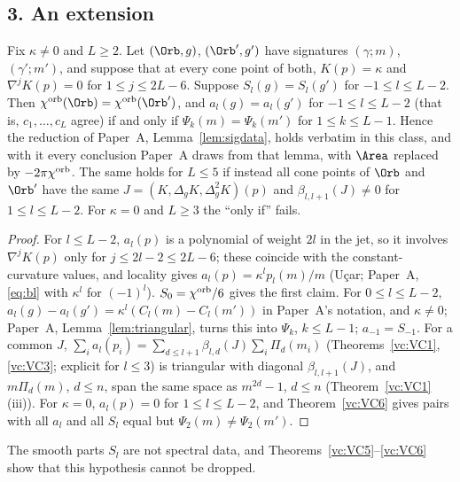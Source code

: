 \subsection*{3. An extension}

\begin{theorem}\label{vc:VC4}
Fix $\kappa\ne0$ and $L\ge2$. Let $(\Orb,g)$, $(\Orb',g')$ have signatures $(\gamma;m)$, $(\gamma';m')$,
and suppose that at every cone point of both, $K(p)=\kappa$ and $\nabla^jK(p)=0$ for $1\le j\le2L-6$.
Suppose $S_l(g)=S_l(g')$ for $-1\le l\le L-2$. Then $\chi^{\rm orb}(\Orb)=\chi^{\rm orb}(\Orb')$, and
$a_l(g)=a_l(g')$ for $-1\le l\le L-2$ (that is, $c_1,\dots,c_L$ agree) if and only if
$\Psi_k(m)=\Psi_k(m')$ for $1\le k\le L-1$. Hence the reduction of Paper~A, Lemma~\ref{lem:sigdata}, holds
verbatim in this class, and with it every conclusion Paper~A draws from that lemma, with $\Area$ replaced
by $-2\pi\chi^{\rm orb}$.
The same holds for $L\le5$ if instead all cone points of $\Orb$ and $\Orb'$ have the same
$J=(K,\Delta_gK,\Delta_g^2K)(p)$ and $\beta_{l,l+1}(J)\ne0$ for $1\le l\le L-2$. For $\kappa=0$ and $L\ge3$
the ``only if'' fails.
\end{theorem}

\begin{proof}
For $l\le L-2$, $a_l(p)$ is a polynomial of weight $2l$ in the jet, so it involves $\nabla^jK(p)$ only for
$j\le2l-2\le2L-6$; these coincide with the constant-curvature values, and locality
\cite[4.1]{dggw2008} gives $a_l(p)=\kappa^lp_l(m)/m$ (U\c{c}ar; Paper~A, \eqref{eq:bl} with $\kappa^l$ for
$(-1)^l$). $S_0=\chi^{\rm orb}/6$ gives the first claim. For $0\le l\le L-2$,
$a_l(g)-a_l(g')=\kappa^l(C_l(m)-C_l(m'))$ in Paper~A's notation, and $\kappa\ne0$; Paper~A,
Lemma~\ref{lem:triangular}, turns this into $\Psi_k$, $k\le L-1$; $a_{-1}=S_{-1}$. For a common $J$,
$\sum_ia_l(p_i)=\sum_{d\le l+1}\beta_{l,d}(J)\sum_i\Pi_d(m_i)$ (Theorems~\ref{vc:VC1}, \ref{vc:VC3}; explicit for
$l\le3$) is triangular with diagonal $\beta_{l,l+1}(J)$, and $m\Pi_d(m)$, $d\le n$, span the same space as
$m^{2d}-1$, $d\le n$ (Theorem~\ref{vc:VC1}(iii)). For $\kappa=0$, $a_l(p)=0$ for $1\le l\le L-2$, and
Theorem~\ref{vc:VC6} gives pairs with all $a_l$ and all $S_l$ equal but $\Psi_2(m)\ne\Psi_2(m')$.
\end{proof}

The smooth parts $S_l$ are not spectral data, and Theorems~\ref{vc:VC5}--\ref{vc:VC6} show that this
hypothesis cannot be dropped.


